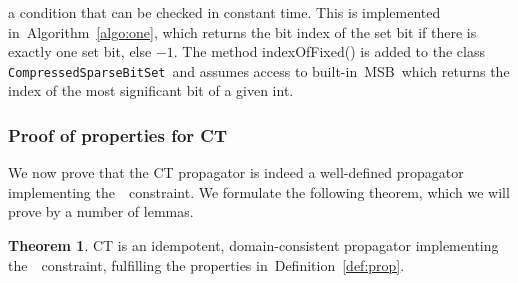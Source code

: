 \documentclass[a4paper,11pt]{article}
\theoremstyle{definition}
\newtheorem{theorem}{Theorem}[section]
\newcommand{\Algoref}[1]{Algorithm~\ref{#1}}
\newcommand{\Table}{\Constraint{Table}}
\newcommand{\Defref}[1]{Definition~\ref{#1}}
\newcommand{\SparseBitSet}{\texttt{CompressedSparseBitSet}}
\def\FixDomains{\textsc{Fix\-Domains}}
\numberwithin{equation}{section}
\begin{document}
\begin{description}
\noindent
a condition that can be checked in constant time.
This is implemented in~\Algoref{algo:one}, which returns
the bit index of the set bit if there is exactly one set bit, else $-1$.
The method indexOfFixed() is added to the class \SparseBitSet~and assumes access to
built-in~\textsc{MSB}~which returns the index of the most significant bit of a given int.

\begin{algorithm}[t]
  \begin{algorithmic}[1]  %
    
  \end{algorithmic}
  \caption{Checking if exactly one bit is set in \SparseBitSet.}
  \label{algo:one}
\end{algorithm}

\end{description}

%     

\subsubsection{Proof of properties for CT}
\label{sec:proof}

\begin{sloppypar}
We now prove that the CT propagator is indeed a well-defined propagator
implementing the~\Table~constraint. We formulate the following theorem, which
we will prove by a number of lemmas.
\end{sloppypar}

\begin{theorem} \label{thm:prop}
  CT is an idempotent, domain-consistent propagator implementing
  the~\Table~constraint, fulfilling the properties in~\Defref{def:prop}.
\end{theorem}
\end{document}
